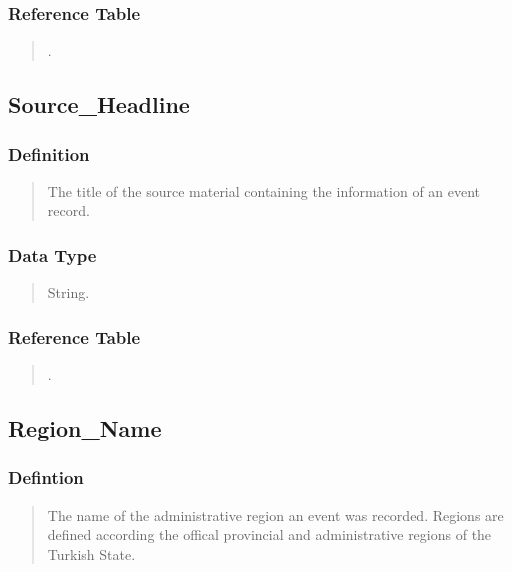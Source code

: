 \documentclass[letterpaper,10pt,english]{sphinxmanual}
\begin{document}
\subsubsection{Reference Table}
\label{\detokenize{database_schema:id19}}\begin{quote}

\sphinxAtStartPar
{\hyperref[\detokenize{database_schema:overview-table}]{}}.
\end{quote}


\subsection{Source\_Headline}
\label{\detokenize{database_schema:source-headline}}

\subsubsection{Definition}
\label{\detokenize{database_schema:id20}}\begin{quote}

\sphinxAtStartPar
The title of the source material containing the information of an event record.
\end{quote}


\subsubsection{Data Type}
\label{\detokenize{database_schema:id21}}\begin{quote}

\sphinxAtStartPar
String.
\end{quote}


\subsubsection{Reference Table}
\label{\detokenize{database_schema:id22}}\begin{quote}

\sphinxAtStartPar
{\hyperref[\detokenize{database_schema:overview-table}]{}}.
\end{quote}


\subsection{Region\_Name}
\label{\detokenize{database_schema:region-name}}

\subsubsection{Defintion}
\label{\detokenize{database_schema:defintion}}\begin{quote}

\sphinxAtStartPar
The name of the administrative region an event was recorded.  Regions are defined according the offical provincial and administrative regions of the Turkish State.
\end{quote}
\end{document}
